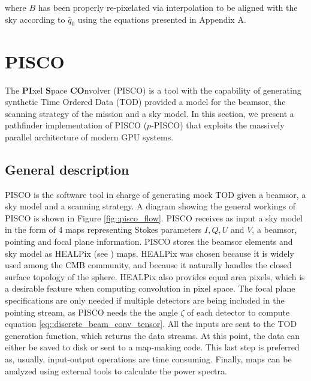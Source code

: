 \documentclass[a4paper,11pt]{article}
\begin{document}
\noindent
where $B$ has been properly re-pixelated via interpolation to be aligned with the sky according to $\bar{q}_0$ using the equations presented in Appendix A.

\section{PISCO}
\label{sec::pisco}

The \textbf{PI}xel \textbf{S}pace \textbf{CO}nvolver (PISCO) is a tool with the capability of generating synthetic Time Ordered Data (TOD) provided a model for the beamsor, the scanning strategy of the mission and a sky model. In this section, we present a pathfinder implementation of PISCO ($p$-PISCO) that exploits the massively parallel architecture of modern GPU systems.

\subsection{General description}

PISCO is the software tool in charge of generating mock TOD given a beamsor, a sky model and a scanning strategy. A diagram showing the general workings of PISCO is shown in Figure \ref{fig::pisco_flow}. PISCO receives as input a sky model in the form of 4 maps representing Stokes parameters $I,Q,U$ and $V$, a beamsor, pointing and focal plane information. PISCO stores the beamsor elements and sky model as HEALPix (see \cite{2005ApJ...622..759G}) maps. HEALPix was chosen because it is widely used among the CMB community, and because it naturally handles the closed surface topology of the sphere. HEALPix also provides equal area pixels, which is a desirable feature when computing convolution in pixel space. The focal plane specifications are only needed if multiple detectors are being included in the pointing stream, as PISCO needs the the angle $\zeta$ of each detector to compute equation \ref{eq::discrete_beam_conv_tensor}. All the inputs are sent to the TOD generation function, which returns the data streams. At this point, the data can either be saved to disk or sent to a map-making code. This last step is preferred as, usually, input-output operations are time consuming. Finally, maps can be analyzed using external tools to calculate the power spectra.
\end{document}
